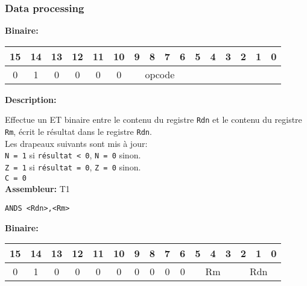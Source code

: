 \documentclass{article}
\begin{document}
    \subsubsection{Data processing}
    \label{subsubsec:DataProc}

    \textbf{Binaire:}\\

    \begin{tabular}{| c c c c c c c c c c c c c c c c |}
        \hline
        15 & 14 & 13 & 12 & 11 & 10 & \multicolumn{1}{|c}{9} & 8 & 7 & 6 & \multicolumn{1}{|c}{5} & 4 & 3 & 2 & 1 & 0 \\
        \hline
        0 & 1 & 0 & 0 & 0 & 0 & \multicolumn{4}{|c}{opcode} & \multicolumn{6}{|c|}{} \\
        \hline
    \end{tabular}


    \textbf{Description: }

    Effectue un ET binaire entre le contenu du registre \texttt{Rdn} et le contenu du registre \texttt{Rm}, écrit le résultat dans le registre \texttt{Rdn}.\\
    Les drapeaux suivants sont mis à jour:\\
    \texttt{N = 1} si \texttt{résultat < 0}, \texttt{N = 0} sinon.\\
    \texttt{Z = 1} si \texttt{résultat = 0}, \texttt{Z = 0} sinon.\\
    \texttt{C = 0}\\

    \textbf{Assembleur:} T1

    \begin{lstlisting}
ANDS <Rdn>,<Rm>
    \end{lstlisting}

    \textbf{Binaire:}\\

    \begin{tabular}{| c c c c c c c c c c c c c c c c |}
        \hline
        15 & 14 & 13 & 12 & 11 & 10 & \multicolumn{1}{|c}{9} & 8 & 7 & 6 & \multicolumn{1}{|c}{5} & 4 & 3 & \multicolumn{1}{|c}{2} & 1 & 0 \\
        \hline
        0 & 1 & 0 & 0 & 0 & 0 & \multicolumn{1}{|c}{0} & 0 & 0 & 0 & \multicolumn{3}{|c}{Rm} & \multicolumn{3}{|c|}{Rdn} \\
        \hline
    \end{tabular}
\end{document}
